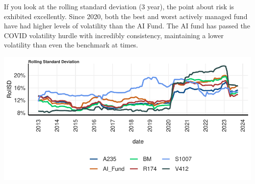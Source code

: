 \documentclass[11pt,preprint, authoryear]{elsarticle}
\let\origfigure\figure
\let\endorigfigure\endfigure
\renewenvironment{figure}[1][2] {
    \expandafter\origfigure\expandafter[H]
} {
    \endorigfigure
}
\numberwithin{equation}{section}
\numberwithin{figure}{section}
\numberwithin{table}{section}
\begin{document}
If you look at the rolling standard deviation (3 year), the point about
risk is exhibited excellently. Since 2020, both the best and worst
actively managed fund have had higher levels of volatility than the AI
Fund. The AI fund has passed the COVID volatility hurdle with incredibly
consistency, maintaining a lower volatility than even the benchmark at
times.

\begin{figure}[H]

{\centering \includegraphics{Question-1_files/figure-latex/unnamed-chunk-7-1} 

}

\caption{ \label{Figure1.6}}\label{fig:unnamed-chunk-7}
\end{figure}


\end{document}
